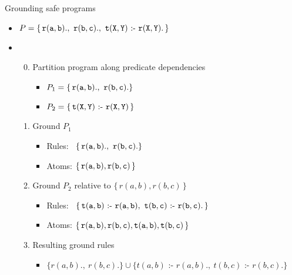 \begin{frame}{Grounding safe programs}
  \begin{itemize}
  \item<1->
    \(
    P = \{\tt\, r(a,b)., \ r(b,c)., \ t(X,Y)\text{ :- }r(X,Y).\,\}
    \)
    \medskip
  \item <2-> 
    \smallskip
    \begin{enumerate}\setcounter{enumi}{-1}
    \item <3-> Partition program along predicate dependencies
      \begin{itemize}\small
      \item \( P_1 = \{\tt\, r(a,b).,    \ r(b,c). \} \)
      \item \( P_2 = \{\tt\, t(X,Y) \text{ :- } r(X,Y) \,\} \)
      \end{itemize}
      \smallskip
    \item <4-> Ground $P_1$
      \begin{itemize}\small
      \item Rules: \ $\{\tt\, r(a,b)., \ r(b,c). \}$
      \item Atoms:   $\{\tt\, r(a,b), r(b,c) \,\}$
      \end{itemize}
      \smallskip
    \item<5-> Ground $P_2$ relative to $\{\, r(a,b), r(b,c) \,\}$
      \begin{itemize}\small
      \item Rules: \ $\{\tt\, t(a,b) \text{ :- } r(a,b),\ t(b,c) \text{ :- } r(b,c). \,\}$
      \item Atoms:   $\{\tt\, r(a,b), r(b,c), t(a,b), t(b,c) \,\}$
      \end{itemize}
      \smallskip
    \item<6-> Resulting ground rules
      \begin{itemize}\small
      \item  $\{ r(a,b)., \ r(b,c). \}\cup \{ t(a,b) \text{ :- } r(a,b).,\ t(b,c) \text{ :- } r(b,c). \}$
      \end{itemize}
    \end{enumerate}
  \end{itemize}
\end{frame}
%

